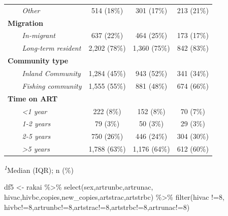 \documentclass[
  letterpaper,
  DIV=11,
  numbers=noendperiod]{scrartcl}
\newenvironment{Shaded}{\begin{snugshade}}{\end{snugshade}}
\newcommand{\DecValTok}[1]{\textcolor[rgb]{0.68,0.00,0.00}{#1}}
\newcommand{\FunctionTok}[1]{\textcolor[rgb]{0.28,0.35,0.67}{#1}}
\newcommand{\NormalTok}[1]{\textcolor[rgb]{0.00,0.23,0.31}{#1}}
\newcommand{\OtherTok}[1]{\textcolor[rgb]{0.00,0.23,0.31}{#1}}
\newcommand{\SpecialCharTok}[1]{\textcolor[rgb]{0.37,0.37,0.37}{#1}}
\begin{document}
\begin{table}
\begin{tabular*}{\linewidth}{@{\extracolsep{\fill}}lccc}
{\itshape     Other} & 514 (18\%) & 301 (17\%) & 213 (21\%) \\ 
{\bfseries Migration} &  &  &  \\ 
{\itshape     In-migrant} & 637 (22\%) & 464 (25\%) & 173 (17\%) \\ 
{\itshape     Long-term resident} & 2,202 (78\%) & 1,360 (75\%) & 842 (83\%) \\ 
{\bfseries Community type} &  &  &  \\ 
{\itshape     Inland Community} & 1,284 (45\%) & 943 (52\%) & 341 (34\%) \\ 
{\itshape     Fishing community} & 1,555 (55\%) & 881 (48\%) & 674 (66\%) \\ 
{\bfseries Time on ART} &  &  &  \\ 
{\itshape     <1 year} & 222 (8\%) & 152 (8\%) & 70 (7\%) \\ 
{\itshape     1-2 years} & 79 (3\%) & 50 (3\%) & 29 (3\%) \\ 
{\itshape     2-5 years} & 750 (26\%) & 446 (24\%) & 304 (30\%) \\ 
{\itshape     >5 years} & 1,788 (63\%) & 1,176 (64\%) & 612 (60\%) \\ 
\bottomrule
\end{tabular*}
\begin{minipage}{\linewidth}
\textsuperscript{\textit{1}}Median (IQR); n (\%)\\
\end{minipage}
\end{table}

\begin{Shaded}
\begin{Highlighting}[]
\NormalTok{df5 }\OtherTok{\textless{}{-}}\NormalTok{ rakai }\SpecialCharTok{\%\textgreater{}\%} 
  \FunctionTok{select}\NormalTok{(sex,artrunbc,artrunac,}
\NormalTok{         hivac,hivbc,copies,new\_copies,artstrac,artstrbc) }\SpecialCharTok{\%\textgreater{}\%} 
  \FunctionTok{filter}\NormalTok{(hivac }\SpecialCharTok{!=}\DecValTok{8}\NormalTok{, hivbc}\SpecialCharTok{!=}\DecValTok{8}\NormalTok{,artrunbc}\SpecialCharTok{!=}\DecValTok{8}\NormalTok{,artstrac}\SpecialCharTok{!=}\DecValTok{8}\NormalTok{,artstrbc}\SpecialCharTok{!=}\DecValTok{8}\NormalTok{,artrunac}\SpecialCharTok{!=}\DecValTok{8}\NormalTok{)}
\end{Highlighting}
\end{Shaded}
\end{document}

